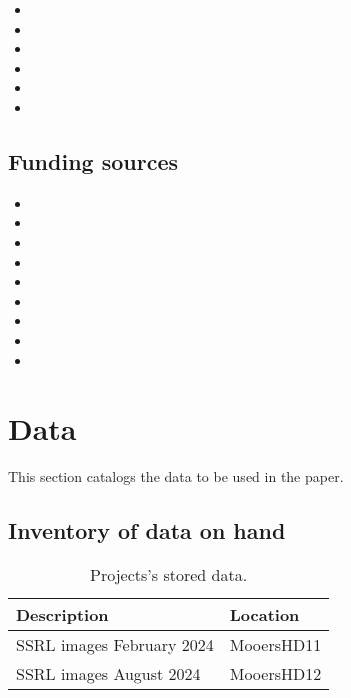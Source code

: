 \documentclass[11pt,letterpaper]{article}
\begin{document}
\begin{itemize}
\item 

\item 

\item 

\item 

\item 

\item 
\end{itemize}

\subsection{Funding sources}
\label{sec:org07dbfe5}

\begin{itemize}
\item 

\item 

\item 

\item 

\item 

\item 

\item 

\item 

\item 
\end{itemize}


\section{Data}
\label{sec:org3d45080}

This section catalogs the data to be used in the paper.



\subsection{Inventory of data on hand}
\label{sec:org9bf994a}


\begin{table}[htbp]
\caption[Stored data]{Projects's stored data.}
\centering
\begin{tabular}{ll}
Description & Location\\[0pt]
\hline
SSRL images February 2024 & MooersHD11\\[0pt]
SSRL images August 2024 & MooersHD12\\[0pt]
\end{tabular}
\end{table}
\end{document}
